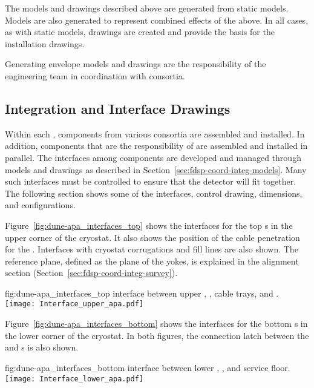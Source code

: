 The models and drawings described above are generated from static
models. Models are also generated to represent combined effects of the
above. In all cases, as with static models, \twod drawings are created
and provide the basis for the installation drawings.


Generating envelope models and drawings are the responsibility of the
 engineering team in coordination with consortia.


\subsection{Integration and Interface Drawings}
\label{sec:fdsp-coord-integ-drawings}

Within each , components from various consortia are
assembled and installed. In addition, components that are the
responsibility of  are assembled and installed in
parallel. The interfaces among components are developed and managed
through models and drawings as described in
Section~\ref{sec:fdsp-coord-integ-models}. Many such interfaces must
be controlled to ensure that the detector will fit together. The
following section shows some of the interfaces, control drawing,
dimensions, and configurations.


Figure~\ref{fig:dune-apa_interfaces_top} shows the interfaces for the
top s in the upper corner of the cryostat. It also shows the position
of the cable penetration for the . Interfaces with cryostat
corrugations and  fill lines are also shown. The reference plane,
defined as the plane of the  yokes, is explained in the
alignment section (Section~\ref{sec:fdsp-coord-integ-survey}).
\begin{dunefigure}{fig:dune-apa_interfaces_top}
  { interface between upper , , cable
    trays, and .}
  \texttt{[image: Interface\_upper\_apa.pdf]}
\end{dunefigure}


Figure~\ref{fig:dune-apa_interfaces_bottom} shows the interfaces for
the bottom s in the lower corner of the cryostat. In both figures,
the connection latch between the  and s is also
shown.
\begin{dunefigure}{fig:dune-apa_interfaces_bottom}
  { interface between lower , , and
    service floor.}
  \texttt{[image: Interface\_lower\_apa.pdf]}
\end{dunefigure}

